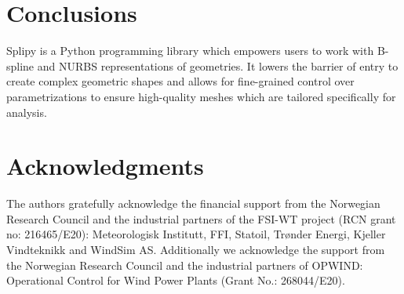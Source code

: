 \documentclass[preprint,12pt, a4paper]{elsarticle}
\begin{document}

\section{Conclusions}
\label{sec:conclusion}

Splipy is a Python programming library which empowers users to work with B-spline and NURBS representations of geometries.
It lowers the barrier of entry to create complex geometric shapes and allows for fine-grained control over parametrizations to ensure high-quality meshes which are tailored specifically for analysis.

\section*{Acknowledgments}
\label{}

The authors gratefully acknowledge the financial support from the Norwegian Research Council and the industrial partners of the FSI-WT project (RCN grant no: 216465/E20): Meteorologisk Institutt, FFI, Statoil, Tr\o nder Energi, Kjeller Vindteknikk and WindSim AS. Additionally we acknowledge the support from the Norwegian Research Council and the industrial partners of OPWIND: Operational Control for Wind Power Plants (Grant No.: 268044/E20).


\end{document}
